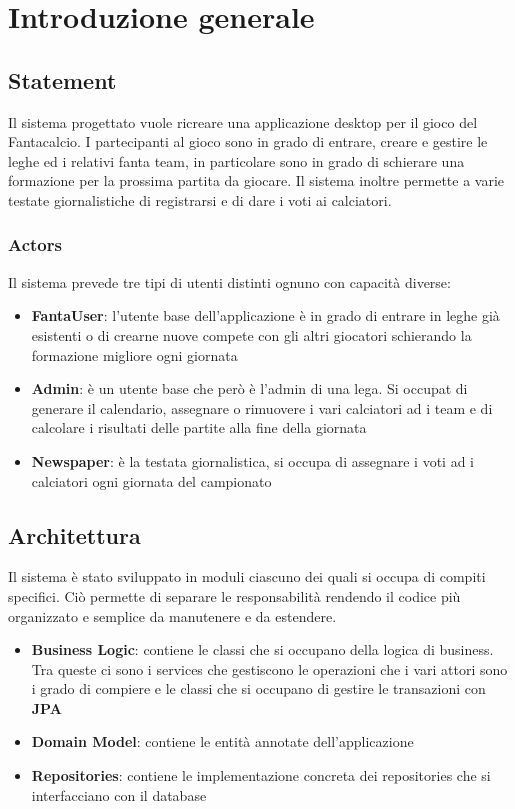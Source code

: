 \section{Introduzione generale}

\subsection{Statement}
Il sistema progettato vuole ricreare una applicazione desktop per il gioco del
Fantacalcio. I partecipanti al gioco sono in grado di entrare, creare e gestire le leghe ed i 
relativi fanta team, in particolare sono in grado di schierare una formazione per la prossima partita
da giocare. Il sistema inoltre permette a varie testate giornalistiche di registrarsi e di dare i voti ai 
calciatori.
\subsubsection{Actors}
Il sistema prevede tre tipi di utenti distinti ognuno con capacità diverse:
\begin{itemize}
    \item \textbf{FantaUser}: l'utente base dell'applicazione è in grado di entrare in leghe già esistenti o di crearne nuove
    compete con gli altri giocatori schierando la formazione migliore ogni giornata
    \item \textbf{Admin}: è un utente base che però è l'admin di una lega. Si occupat di generare il calendario,  
    assegnare o rimuovere i vari calciatori ad i team e di calcolare i risultati delle partite alla fine della giornata
    \item \textbf{Newspaper}: è la testata giornalistica, si occupa di assegnare i voti ad i calciatori ogni giornata del campionato
\end{itemize}

\subsection{Architettura}
Il sistema è stato sviluppato in moduli ciascuno dei quali si occupa di compiti specifici.
Ciò permette di separare le responsabilità rendendo il codice più organizzato e semplice 
da manutenere e da estendere.
\begin{itemize}
    \item \textbf{Business Logic}: contiene le classi che si occupano della logica di 
    business. Tra queste ci sono i services che gestiscono le operazioni che i vari 
    attori sono i grado di compiere e le classi che si occupano di gestire le transazioni con \textbf{JPA}
    \item \textbf{Domain Model}: contiene le entità annotate dell'applicazione
    \item \textbf{Repositories}: contiene le implementazione concreta dei repositories che si interfacciano con il database
\end{itemize}
